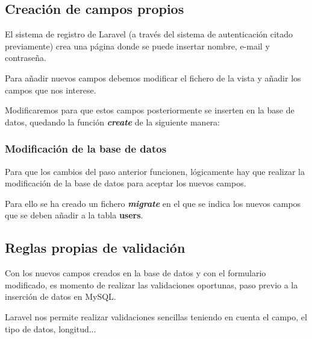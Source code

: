 \documentclass{\ClassPath/viu-tfm-template}
\begin{document}
\subsection{Creación de campos propios}
El sistema de registro de Laravel (a través del sistema de autenticación citado previamente) crea una página donde se puede insertar nombre, e-mail y contraseña.

Para añadir nuevos campos debemos modificar el fichero de la vista  y añadir los campos que nos interese.

Modificaremos  para que estos campos posteriormente se inserten en la base de datos, quedando la función \textit{\textbf{create}} de la siguiente manera:





\subsubsection{Modificación de la base de datos}
Para que los cambios del paso anterior funcionen, lógicamente hay que realizar la modificación de la base de datos para aceptar los nuevos campos.

Para ello se ha creado un fichero \textbf{\textit{migrate}} en el que se indica  los nuevos campos que se deben añadir a la tabla \textbf{users}.


\subsection{Reglas propias de validación}
Con los nuevos campos creados en la base de datos y con el formulario modificado, es momento de realizar las validaciones oportunas, paso previo a la inserción de datos en MySQL.

Laravel nos permite realizar validaciones sencillas teniendo en cuenta el campo, el tipo de datos, longitud...
\end{document}
